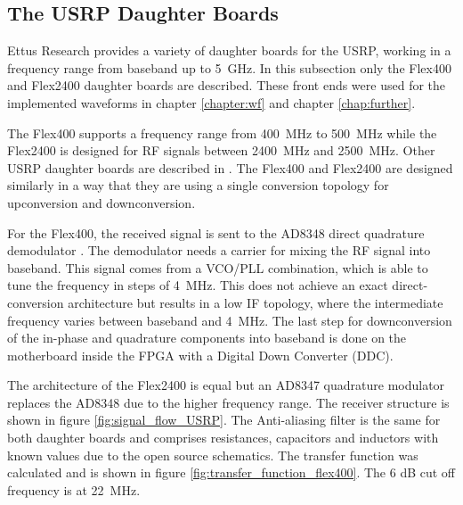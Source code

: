 \subsection{The USRP Daughter Boards}
\label{subsec:USRP_DB}
Ettus Research provides a variety of daughter boards for the \ac{USRP}, working in a frequency range from baseband up to  \SI{5}{GHz}. In this subsection only the Flex400 and Flex2400 daughter boards are described. These front ends were used for the implemented waveforms in chapter \ref{chapter:wf} and chapter \ref{chap:further}.

The Flex400 supports a frequency range from \SI{400}{MHz} to \SI{500}{MHz} while the Flex2400 is designed for RF signals between \SI{2400}{MHz} and \SI{2500}{MHz}. Other  \ac{USRP} daughter boards are described in \cite{ettus:website}. The Flex400 and Flex2400 are designed similarly in a way that they are using a single conversion topology for upconversion and downconversion.

For the Flex400, the received signal is sent to the AD8348 direct quadrature demodulator \cite{ad8348}. The demodulator needs a carrier for mixing the RF signal into baseband. This signal comes from a \ac{VCO}/\ac{PLL} combination, which is able to tune the frequency in steps of \SI{4}{MHz}. This does not achieve an exact direct-conversion architecture but results in a low IF topology, where the intermediate frequency varies between baseband and \SI{4}{MHz}. The last step for downconversion of the in-phase and quadrature components into baseband is done on the motherboard inside the FPGA with a Digital Down Converter (DDC).

The architecture of the Flex2400 is equal but an AD8347 \cite{ad8347} quadrature modulator replaces the AD8348 due to the higher frequency range. The receiver structure is shown in figure \ref{fig:signal_flow_USRP}. The Anti-aliasing filter is the same for both daughter boards and comprises resistances, capacitors and inductors with known values due to the open source schematics. The transfer function was calculated and is shown in figure \ref{fig:transfer_function_flex400}. The 6 dB cut off frequency is at \SI{22}{MHz}.

